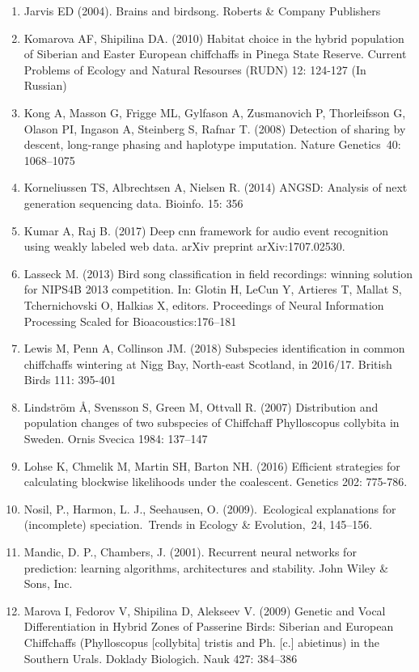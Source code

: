 \documentclass[11pt,a4paper]{article}
\begin{document}
\begin{enumerate}
\item Jarvis ED (2004). Brains and birdsong. Roberts \& Company Publishers
\item Komarova AF, Shipilina DA. (2010) Habitat choice in the hybrid population of Siberian and Easter European chiffchaffs in Pinega State Reserve. Current Problems of Ecology and Natural Resourses (RUDN) 12: 124-127 (In Russian)
\item Kong A, Masson G, Frigge ML, Gylfason A, Zusmanovich P, Thorleifsson G, Olason PI, Ingason A, Steinberg S, Rafnar T. (2008) Detection of sharing by descent, long-range phasing and haplotype imputation. Nature Genetics 40: 1068–1075
\item Korneliussen TS, Albrechtsen A, Nielsen R. (2014) ANGSD: Analysis of next generation sequencing data. Bioinfo. 15: 356 
\item Kumar A, Raj B. (2017) Deep cnn framework for audio event recognition using weakly labeled web data. arXiv preprint arXiv:1707.02530.
\item Lasseck M. (2013) Bird song classification in field recordings: winning solution for NIPS4B 2013 competition. In: Glotin H, LeCun Y, Artieres T, Mallat S, Tchernichovski O, Halkias X, editors. Proceedings of Neural Information Processing Scaled for Bioacoustics:176–181 
\item Lewis M, Penn A, Collinson JM. (2018) Subspecies identification in common chiffchaffs wintering at Nigg Bay, North-east Scotland, in 2016/17. British Birds 111: 395-401
\item Lindström Å, Svensson S, Green M, Ottvall R. (2007) Distribution and population changes of two subspecies of Chiffchaff Phylloscopus collybita in Sweden. Ornis Svecica 1984: 137–147
\item Lohse K, Chmelik M, Martin SH, Barton NH. (2016) Efficient strategies for calculating blockwise likelihoods under the coalescent. Genetics 202: 775-786. 
\item Nosil, P., Harmon, L. J., Seehausen, O. (2009). Ecological explanations for (incomplete) speciation. Trends in Ecology \& Evolution, 24, 145–156.
\item Mandic, D. P., Chambers, J. (2001). Recurrent neural networks for prediction: learning algorithms, architectures and stability. John Wiley \& Sons, Inc.
\item Marova I, Fedorov V, Shipilina D, Alekseev V. (2009) Genetic and Vocal Differentiation in Hybrid Zones of Passerine Birds: Siberian and European Chiffchaffs (Phylloscopus [collybita] tristis and Ph. [c.] abietinus) in the Southern Urals. Doklady Biologich. Nauk 427: 384–386 

\end{enumerate}
\end{document}
